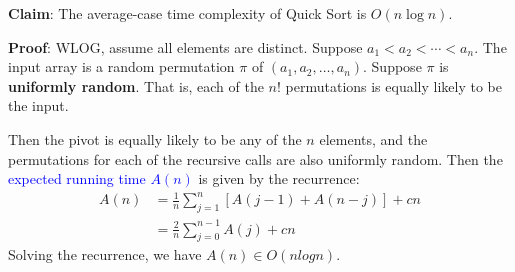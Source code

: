 \textbf{Claim}: The average-case time complexity of Quick Sort is $O(n\log n)$.

\textbf{Proof}: WLOG, assume all elements are distinct. Suppose
$a_1<a_2<\cdots<a_{n}$. The input array is a \textcolor{Bittersweet}{random
permutation $\pi$} of $\left( a_1,a_2,\ldots,a_{n} \right) $. Suppose $\pi$ is
\textcolor{Bittersweet}{\textbf{uniformly random}}. That is, each of the
$n\mathpunct{!}$ permutations is equally likely to be the input.

Then the pivot is equally likely to be any of the $n$ elements, and the
permutations for each of the recursive calls are also uniformly random. Then
the \textcolor{Blue}{expected running time $A(n)$} is given by the recurrence:
\begin{align*}
  A(n)&=\frac{1}{n}\sum_{j=1}^{n} \left[ A\left( j-1 \right) +A\left( n-j
\right)  \right] +cn\\
      &=\frac{2}{n}\sum_{j=0}^{n-1} A(j) +cn
\end{align*}
Solving the recurrence, we have $A(n) \in O(n log n)$.
